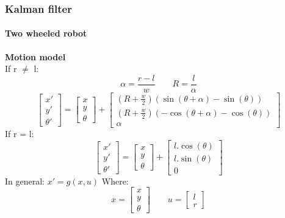 \documentclass{beamer}
\begin{document}
	\begin{frame}
		\frametitle{Kalman filter}
		
		\framesubtitle{Two wheeled robot}

		\textbf{Motion model}\\
		If r $\neq$ l:
		\begin{equation*}
			\alpha= \frac{r-l}{w}
		\qquad
			R=\frac{l}{\alpha}
		\end{equation*}
		\begin{equation*}
			\begin{bmatrix}
				x'\\y'\\\theta'
			\end{bmatrix}
			=
			\begin{bmatrix}
				x\\y\\\theta
			\end{bmatrix}
			+
			\begin{bmatrix}
				\left(R+\frac{w}{2}\right)(\sin(\theta+\alpha)-\sin(\theta))\\
				\left(R+\frac{w}{2}\right)(-\cos(\theta+\alpha)-\cos(\theta))\\
				\alpha
			\end{bmatrix}
		\end{equation*}	
		If r = l:
		\begin{equation*}
			\begin{bmatrix}
				x'\\y'\\\theta'
			\end{bmatrix}
			=
			\begin{bmatrix}
				x\\y\\\theta
			\end{bmatrix}
			+
			\begin{bmatrix}
				l.\cos(\theta)\\
				l.\sin(\theta)\\
				0
			\end{bmatrix}
		\end{equation*}	
		In general:
		$ x'=g(x,u) $ Where:
		\begin{equation*}
			x=
			\begin{bmatrix}
				x\\y\\\theta
			\end{bmatrix}
			\qquad
			u=
			\begin{bmatrix}
				l\\r
			\end{bmatrix}
		\end{equation*}

	\end{frame}
\end{document}
